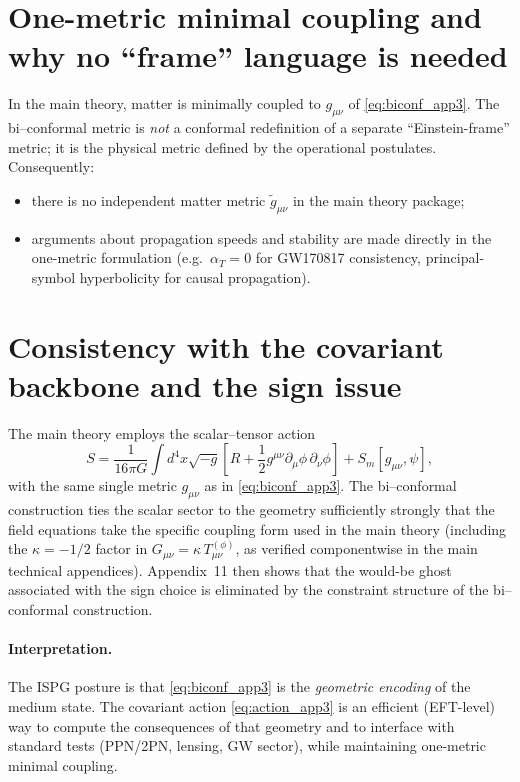 \documentclass[11pt]{article}
\begin{document}
\section{One-metric minimal coupling and why no ``frame'' language is needed}\label{sec:onemetric}
In the main theory, matter is minimally coupled to $g_{\mu\nu}$ of \eqref{eq:biconf_app3}. The bi--conformal metric is \emph{not} a conformal redefinition of a separate ``Einstein-frame'' metric; it is the physical metric defined by the operational postulates. Consequently:
\begin{itemize}
\item there is no independent matter metric $\tilde g_{\mu\nu}$ in the main theory package;
\item arguments about propagation speeds and stability are made directly in the one-metric formulation (e.g.\ $\alpha_T=0$ for GW170817 consistency, principal-symbol hyperbolicity for causal propagation).
\end{itemize}

\section{Consistency with the covariant backbone and the sign issue}\label{sec:sign}
The main theory employs the scalar--tensor action
\begin{equation}
S=\frac{1}{16\pi G}\int d^4x\sqrt{-g}\left[R+\frac12 g^{\mu\nu}\partial_\mu\phi\,\partial_\nu\phi\right]+S_m[g_{\mu\nu},\psi],
\label{eq:action_app3}
\end{equation}
with the same single metric $g_{\mu\nu}$ as in \eqref{eq:biconf_app3}. The bi--conformal construction ties the scalar sector to the geometry sufficiently strongly that the field equations take the specific coupling form used in the main theory (including the $\kappa=-1/2$ factor in $G_{\mu\nu}=\kappa\,T^{(\phi)}_{\mu\nu}$, as verified componentwise in the main technical appendices). Appendix~11 then shows that the would-be ghost associated with the sign choice is eliminated by the constraint structure of the bi--conformal construction.

\paragraph{Interpretation.}
The ISPG posture is that \eqref{eq:biconf_app3} is the \emph{geometric encoding} of the medium state. The covariant action \eqref{eq:action_app3} is an efficient (EFT-level) way to compute the consequences of that geometry and to interface with standard tests (PPN/2PN, lensing, GW sector), while maintaining one-metric minimal coupling.
\end{document}
